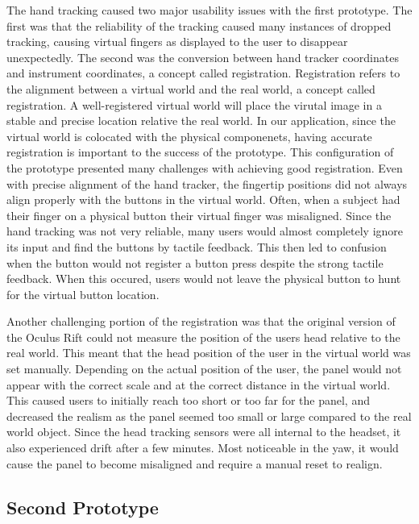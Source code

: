 The hand tracking caused two major usability issues with the first prototype.
The first was that the reliability of the tracking caused many instances of dropped tracking, causing virtual fingers as displayed to the user to disappear unexpectedly.
The second was the conversion between hand tracker coordinates and instrument coordinates, a concept called registration.
Registration refers to the alignment between a virtual world and the real world, a concept called registration.
A well-registered virtual world will place the virutal image in a stable and precise location relative the real world.
In our application, since the virtual world is colocated with the physical componenets, having accurate registration is important to the success of the prototype.
This configuration of the prototype presented many challenges with achieving good registration.
Even with precise alignment of the hand tracker, the fingertip positions did not always align properly with the buttons in the virtual world.
Often, when a subject had their finger on a physical button their virtual finger was misaligned.
Since the hand tracking was not very reliable, many users would almost completely ignore its input and find the buttons by tactile feedback.
This then led to confusion when the button would not register a button press despite the strong tactile feedback.
When this occured, users would not leave the physical button to hunt for the virtual button location.

Another challenging portion of the registration was that the original version of the Oculus Rift could not measure the position of the users head relative to the real world.
This meant that the head position of the user in the virtual world was set manually.
Depending on the actual position of the user, the panel would not appear with the correct scale and at the correct distance in the virtual world.
This caused users to initially reach too short or too far for the panel, and decreased the realism as the panel seemed too small or large compared to the real world object.
Since the head tracking sensors were all internal to the headset, it also experienced drift after a few minutes.
Most noticeable in the yaw, it would cause the panel to become misaligned and require a manual reset to realign.

\subsection{Second Prototype}

